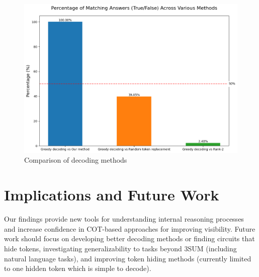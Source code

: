 \documentclass[10pt,a4paper]{article}
\begin{document}
\begin{figure}[H]
\centering
\includegraphics[width=\textwidth]{token_comparison_percentages.png}
\caption{Comparison of decoding methods}
\label{fig:decoding_comparison}
\end{figure}

\section{Implications and Future Work}
Our findings provide new tools for understanding internal reasoning processes and increase confidence in COT-based approaches for improving visibility. Future work should focus on developing better decoding methods or finding circuits that hide tokens, investigating generalizability to tasks beyond 3SUM (including natural language tasks), and improving token hiding methods (currently limited to one hidden token which is simple to decode).

\clearpage
\end{document}
